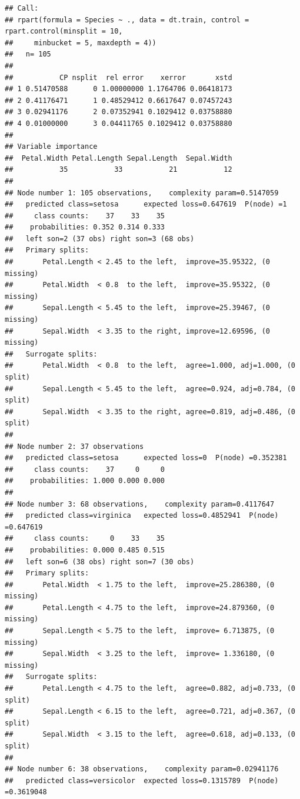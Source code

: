 \documentclass[]{book}
\theoremstyle{plain}
\theoremstyle{definition}
\begin{document}
\begin{verbatim}
## Call:
## rpart(formula = Species ~ ., data = dt.train, control = rpart.control(minsplit = 10, 
##     minbucket = 5, maxdepth = 4))
##   n= 105 
## 
##           CP nsplit  rel error    xerror       xstd
## 1 0.51470588      0 1.00000000 1.1764706 0.06418173
## 2 0.41176471      1 0.48529412 0.6617647 0.07457243
## 3 0.02941176      2 0.07352941 0.1029412 0.03758880
## 4 0.01000000      3 0.04411765 0.1029412 0.03758880
## 
## Variable importance
##  Petal.Width Petal.Length Sepal.Length  Sepal.Width 
##           35           33           21           12 
## 
## Node number 1: 105 observations,    complexity param=0.5147059
##   predicted class=setosa      expected loss=0.647619  P(node) =1
##     class counts:    37    33    35
##    probabilities: 0.352 0.314 0.333 
##   left son=2 (37 obs) right son=3 (68 obs)
##   Primary splits:
##       Petal.Length < 2.45 to the left,  improve=35.95322, (0 missing)
##       Petal.Width  < 0.8  to the left,  improve=35.95322, (0 missing)
##       Sepal.Length < 5.45 to the left,  improve=25.39467, (0 missing)
##       Sepal.Width  < 3.35 to the right, improve=12.69596, (0 missing)
##   Surrogate splits:
##       Petal.Width  < 0.8  to the left,  agree=1.000, adj=1.000, (0 split)
##       Sepal.Length < 5.45 to the left,  agree=0.924, adj=0.784, (0 split)
##       Sepal.Width  < 3.35 to the right, agree=0.819, adj=0.486, (0 split)
## 
## Node number 2: 37 observations
##   predicted class=setosa      expected loss=0  P(node) =0.352381
##     class counts:    37     0     0
##    probabilities: 1.000 0.000 0.000 
## 
## Node number 3: 68 observations,    complexity param=0.4117647
##   predicted class=virginica   expected loss=0.4852941  P(node) =0.647619
##     class counts:     0    33    35
##    probabilities: 0.000 0.485 0.515 
##   left son=6 (38 obs) right son=7 (30 obs)
##   Primary splits:
##       Petal.Width  < 1.75 to the left,  improve=25.286380, (0 missing)
##       Petal.Length < 4.75 to the left,  improve=24.879360, (0 missing)
##       Sepal.Length < 5.75 to the left,  improve= 6.713875, (0 missing)
##       Sepal.Width  < 3.25 to the left,  improve= 1.336180, (0 missing)
##   Surrogate splits:
##       Petal.Length < 4.75 to the left,  agree=0.882, adj=0.733, (0 split)
##       Sepal.Length < 6.15 to the left,  agree=0.721, adj=0.367, (0 split)
##       Sepal.Width  < 3.15 to the left,  agree=0.618, adj=0.133, (0 split)
## 
## Node number 6: 38 observations,    complexity param=0.02941176
##   predicted class=versicolor  expected loss=0.1315789  P(node) =0.3619048

\end{verbatim}
\end{document}
